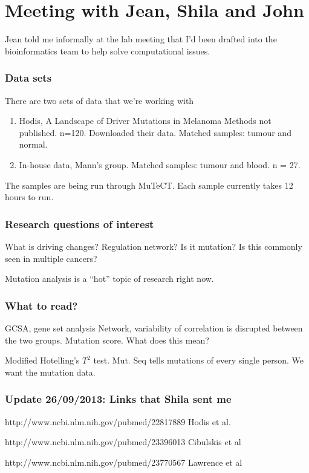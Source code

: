 \documentclass{amsart}
\begin{document}
\part{Meeting with Jean, Shila and John}
Jean told me informally at the lab meeting that I'd been drafted into the bioinformatics team
to help solve computational issues.

\section{Data sets}
There are two sets of data that we're working with
\begin{enumerate}
\item Hodis, A Landscape of Driver Mutations in Melanoma
Methods not published. n=120. Downloaded their data. Matched samples: tumour and normal.
\item In-house data, Mann's group.
Matched samples: tumour and blood. n = 27.
\end{enumerate}

The samples are being run through MuTeCT. Each sample currently takes 12 hours to run.

\section{Research questions of interest}
What is driving changes? Regulation network? Is it mutation? Is this commonly seen in
multiple cancers?

Mutation analysis is a ``hot'' topic of research right now.

\section{What to read?}
GCSA, gene set analysis
Network, variability of correlation is disrupted between the two groups.
Mutation score. What does this mean?

Modified Hotelling's $T^2$ test.
Mut. Seq tells mutations of every single person.
We want the mutation data.

\section{Update 26/09/2013: Links that Shila sent me}
http://www.ncbi.nlm.nih.gov/pubmed/22817889 Hodis et al.

http://www.ncbi.nlm.nih.gov/pubmed/23396013 Cibulskis et al

http://www.ncbi.nlm.nih.gov/pubmed/23770567 Lawrence et al
\end{document}
